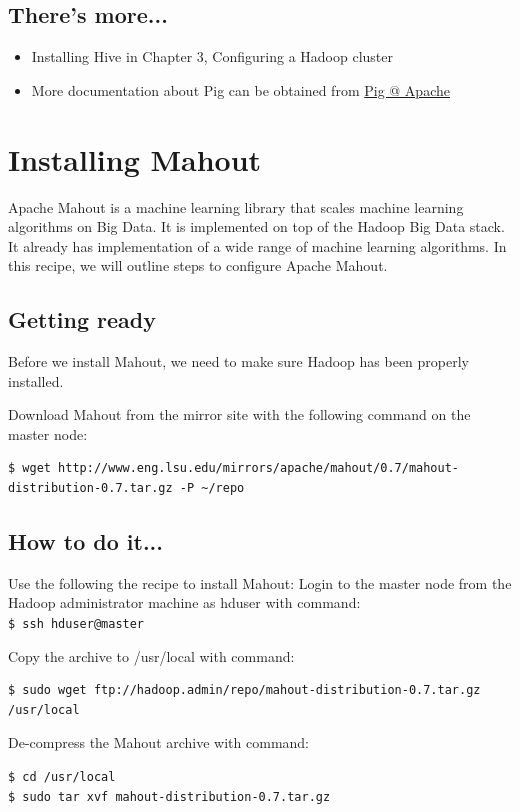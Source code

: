 \subsection*{There's more...}
\begin{itemize}
  \item Installing Hive in Chapter 3, Configuring a Hadoop cluster
  \item More documentation about Pig can be obtained from \href{http://pig.apache.org/docs/r0.10.0/}{Pig @ Apache}
\end{itemize}

\section{Installing Mahout}
Apache Mahout is a machine learning library that scales machine learning algorithms on Big Data. It is implemented on top of the Hadoop Big Data stack. It already has implementation of a wide range of machine learning algorithms. In this recipe, we will outline steps to configure Apache Mahout.
\subsection*{Getting ready}
Before we install Mahout, we need to make sure Hadoop has been properly installed.

Download Mahout from the mirror site with the following command on the master node:
\lstset{style=bashstyle}
\begin{lstlisting}
$ wget http://www.eng.lsu.edu/mirrors/apache/mahout/0.7/mahout-distribution-0.7.tar.gz -P ~/repo
\end{lstlisting}

\subsection*{How to do it...}
Use the following the recipe to install Mahout:
Login to the master node from the Hadoop administrator machine as hduser with command: \\
\verb|$ ssh hduser@master|

Copy the archive to /usr/local with command:
\lstset{style=bashstyle}
\begin{lstlisting}
$ sudo wget ftp://hadoop.admin/repo/mahout-distribution-0.7.tar.gz /usr/local
\end{lstlisting}

De-compress the Mahout archive with command: 
\lstset{style=bashstyle}
\begin{lstlisting}
$ cd /usr/local
$ sudo tar xvf mahout-distribution-0.7.tar.gz
\end{lstlisting}

